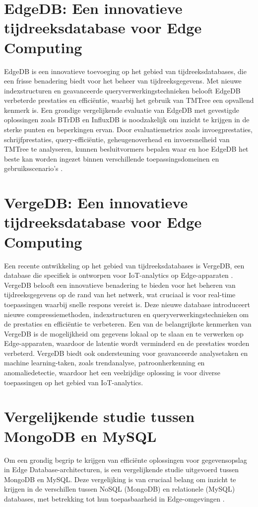 \section{EdgeDB: Een innovatieve tijdreeksdatabase voor Edge Computing}
EdgeDB is een innovatieve toevoeging op het gebied van tijdreeksdatabases, die een frisse benadering biedt voor het beheer van tijdreeksgegevens. Met nieuwe indexstructuren en geavanceerde queryverwerkingstechnieken belooft EdgeDB verbeterde prestaties en efficiëntie, waarbij het gebruik van TMTree een opvallend kenmerk is. Een grondige vergelijkende evaluatie van EdgeDB met gevestigde oplossingen zoals BTrDB en InfluxDB is noodzakelijk om inzicht te krijgen in de sterke punten en beperkingen ervan. Door evaluatiemetrics zoals invoegprestaties, schrijfprestaties, query-efficiëntie, geheugenoverhead en invoersnelheid van TMTree te analyseren, kunnen besluitvormers bepalen waar en hoe EdgeDB het beste kan worden ingezet binnen verschillende toepassingsdomeinen en gebruiksscenario's \autocite{Yang2019EdgeDBAE}.

\section{VergeDB: Een innovatieve tijdreeksdatabase voor Edge Computing}
Een recente ontwikkeling op het gebied van tijdreeksdatabases is VergeDB, een database die specifiek is ontworpen voor IoT-analytics op Edge-apparaten \autocite{Paparrizos2021VergeDBAD}. VergeDB belooft een innovatieve benadering te bieden voor het beheren van tijdreeksgegevens op de rand van het netwerk, wat cruciaal is voor real-time toepassingen waarbij snelle respons vereist is. Deze nieuwe database introduceert nieuwe compressiemethoden, indexstructuren en queryverwerkingstechnieken om de prestaties en efficiëntie te verbeteren. Een van de belangrijkste kenmerken van VergeDB is de mogelijkheid om gegevens lokaal op te slaan en te verwerken op Edge-apparaten, waardoor de latentie wordt verminderd en de prestaties worden verbeterd. VergeDB biedt ook ondersteuning voor geavanceerde analysetaken en machine learning-taken, zoals trendanalyse, patroonherkenning en anomaliedetectie, waardoor het een veelzijdige oplossing is voor diverse toepassingen op het gebied van IoT-analytics.

\section{Vergelijkende studie tussen MongoDB en MySQL}
Om een grondig begrip te krijgen van efficiënte oplossingen voor gegevensopslag in Edge Database-architecturen, is een vergelijkende studie uitgevoerd tussen MongoDB en MySQL. Deze vergelijking is van cruciaal belang om inzicht te krijgen in de verschillen tussen NoSQL (MongoDB) en relationele (MySQL) databases, met betrekking tot hun toepasbaarheid in Edge-omgevingen \autocite{Gyorodi2015comparative}.

